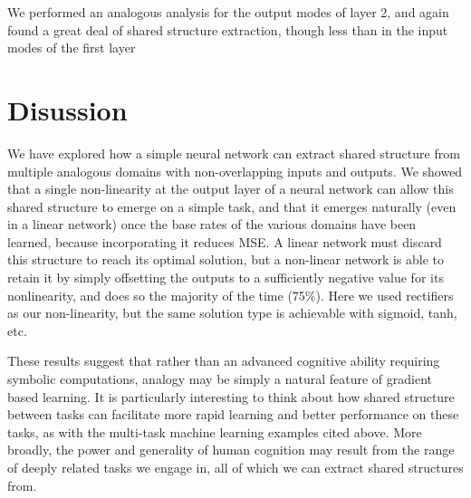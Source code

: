 \documentclass[10pt,letterpaper]{article}
\begin{document}
We performed an analogous analysis for the output modes of layer 2, and again found a great deal of shared structure extraction, though less than in the input modes of the first layer 
\section{Disussion}
We have explored how a simple neural network can extract shared structure from multiple analogous domains with non-overlapping inputs and outputs. We showed that a single non-linearity at the output layer of a neural network can allow this shared structure to emerge on a simple task, and that it emerges naturally (even in a linear network) once the base rates of the various domains have been learned, because incorporating it reduces MSE. A linear network must discard this structure to reach its optimal solution, but a non-linear network is able to retain it by simply offsetting the outputs to a sufficiently negative value for its nonlinearity, and does so the majority of the time (75\%). Here we used rectifiers as our non-linearity, but the same solution type is achievable with sigmoid, tanh, etc. \par 
These results suggest that rather than an advanced cognitive ability requiring symbolic computations, analogy may be simply a natural feature of gradient based learning. It is particularly interesting to think about how shared structure between tasks can facilitate more rapid learning and better performance on these tasks, as with the multi-task machine learning examples cited above. More broadly, the power and generality of human cognition may result from the range of deeply related tasks we engage in, all of which we can extract shared structures from. 
\end{document}
